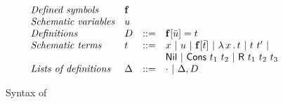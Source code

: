 \documentclass{article}
\begin{document}
\begin{figure}
  \[
  \begin{array}{llll}
   \textit{Defined symbols} & \mathbf{f} & \ &\ \\
   \textit{Schematic variables} & u & \ &\ \\
    \textit{Definitions} & D & ::= & \mathbf{f}[\bar{u}] = t \\
    \textit{Schematic terms} & t & ::= & x\ |\ u\ |\ \mathbf{f}[\bar{t}]\ |\ \lam{x}{t}\ |\ t\ t'\ |\\
    \ &\ &\ & \mathsf{Nil}\ |\ \mathsf{Cons}\ t_1\ t_2\ |\ \mathsf{R}\ t_1\ t_2\ t_3 \\
    \textit{Lists of definitions} & \Delta & ::= & \cdot \ |\ \Delta, D
  \end{array}
  \]
  \caption{Syntax of \sar}
\label{fig:sarsyn}
\end{figure}
\end{document}
